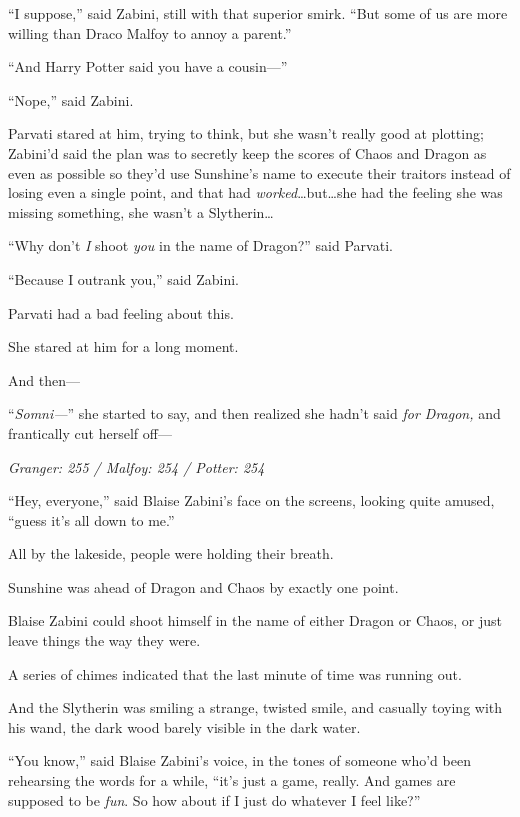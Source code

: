 “I suppose,” said Zabini, still with that superior smirk.
“But some of us are more willing than Draco Malfoy to annoy a parent.”

“And Harry Potter said you have a cousin—”

“Nope,” said Zabini.

Parvati stared at him, trying to think, but she wasn’t really good at plotting; Zabini’d said the plan was to secretly keep the scores of Chaos and Dragon as even as possible so they’d use Sunshine’s name to execute their traitors instead of losing even a single point, and that had \emph{worked}…but…she had the feeling she was missing something, she wasn’t a Slytherin…

“Why don’t \emph{I} shoot \emph{you} in the name of Dragon?” said Parvati.

“Because I outrank you,” said Zabini.

Parvati had a bad feeling about this.

She stared at him for a long moment.

And then—

“\emph{Somni—}” she started to say, and then realized she hadn’t said \emph{for Dragon,} and frantically cut herself off—

\later

\emph{Granger: 255 / Malfoy: 254 / Potter: 254}

“Hey, everyone,” said Blaise Zabini’s face on the screens, looking quite amused, “guess it’s all down to me.”

All by the lakeside, people were holding their breath.

Sunshine was ahead of Dragon and Chaos by exactly one point.

Blaise Zabini could shoot himself in the name of either Dragon or Chaos, or just leave things the way they were.

A series of chimes indicated that the last minute of time was running out.

And the Slytherin was smiling a strange, twisted smile, and casually toying with his wand, the dark wood barely visible in the dark water.

“You know,” said Blaise Zabini’s voice, in the tones of someone who’d been rehearsing the words for a while, “it’s just a game, really. And games are supposed to be \emph{fun}. So how about if I just do whatever I feel like?”

